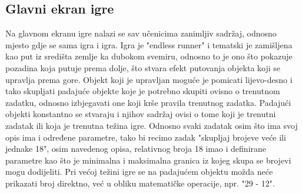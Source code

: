 \documentclass[times, utf8, zavrsni, numeric]{fer}
\begin{document}
		\subsection{Glavni ekran igre}
		Na glavnom ekranu igre nalazi se sav  učenicima zanimljiv sadržaj, odnosno mjesto gdje se sama igra i igra\cite{surfaceview}.  Igra je "endless runner" i tematski je zamišljena kao put iz središta zemlje ka dubokom svemiru, odnosno to je ono što pokazuje
		pozadina koja putuje prema dolje, što stvara efekt putovanja objekta koji se upravlja prema gore. Objekt koji je upravljan moguće je pomicati lijevo-desno i tako skupljati padajuće objekte koje je potrebno skupiti ovisno o trenutnom zadatku,
		odnosno izbjegavati one koji krše pravila trenutnog zadatka. Padajući objekti konstantno se stvaraju i njihov sadržaj ovisi o tome koji je trenutni zadatak ili koja je trenutna težina igre. Odnosno svaki zadatak osim što ima svoj opis ima i određene
		parametre, tako bi recimo zadak "skupljaj brojeve veće ili jednake 18", osim navedenog opisa, relativnog broja 18 imao i definirane parametre kao što je minimalna i maksimalna granica iz kojeg skupa se brojevi mogu dodijeliti. Pri većoj 
		težini igre se na padajućem objektu možda neće prikazati broj direktno, već u obliku matematičke operacije, npr. "29 - 12".
\end{document}
